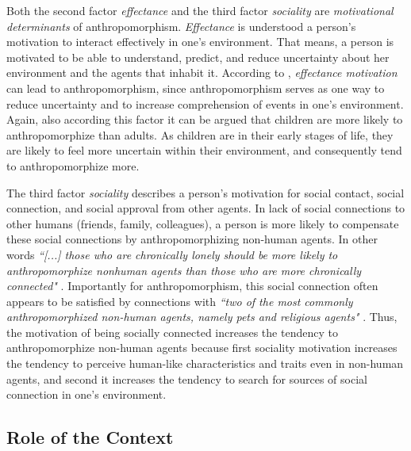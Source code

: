 \documentclass{frontiersSCNS} %
\begin{document}
Both the second factor \textit{effectance} and the third factor
\textit{sociality} are \emph{motivational determinants} of anthropomorphism.
\textit{Effectance} is understood a person's motivation to interact effectively
in one's environment. That means, a person is motivated to be able to
understand, predict, and reduce uncertainty about her environment and the agents
that inhabit it. According to \cite{epley_seeing_2007}, \textit{effectance
motivation} can lead to anthropomorphism, since anthropomorphism serves as one
way to reduce uncertainty and to increase comprehension of events in one's
environment. Again, also according this factor it can be argued that children
are more likely to anthropomorphize than adults. As children are in their early
stages of life, they are likely to feel more uncertain within their environment,
and consequently tend to anthropomorphize more.

The third factor \textit{sociality} describes a person's motivation for social
contact, social connection, and social approval from other agents. In lack of
social connections to other humans (friends, family, colleagues), a person
is more likely to compensate these social connections by anthropomorphizing
non-human agents. In other words \textit{``[...] those who are chronically
lonely should be more likely to anthropomorphize nonhuman agents than those who
are more chronically connected"} \citep{epley_seeing_2007}. Importantly for
anthropomorphism, this social connection often appears to be satisfied by
connections with \textit{``two of the most commonly anthropomorphized non-human
agents, namely pets and religious agents"} \citep{epley_seeing_2007}. Thus, the
motivation of being socially connected increases the tendency to
anthropomorphize non-human agents because first sociality motivation increases
the tendency to perceive human-like characteristics and traits even in non-human
agents, and second it increases the tendency to search for sources of social
connection in one's environment.

%
%
%
%
%
%


\subsection{Role of the Context}
\end{document}
